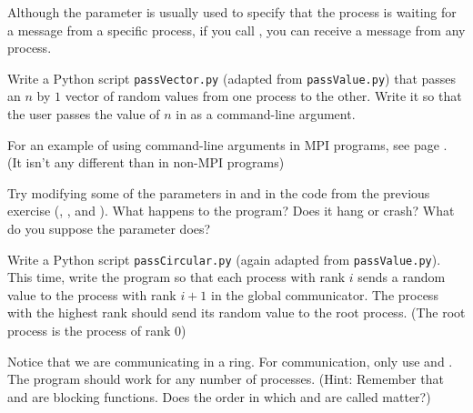 \begin{info}
Although the  parameter  is usually used to specify
that the process is waiting for a message from a specific process, if you call
, you can receive a message from
any process.
\end{info}


\begin{problem}
Write a Python script \texttt{passVector.py} (adapted from
\texttt{passValue.py}) that passes an $n$ by $1$ vector of random values from
one process to the other. Write it so that the user passes the value of $n$ in
as a command-line argument.

For an example of using command-line arguments in MPI programs, see page
\pageref{lst:MPI_Intro:trapParallel.py}. (It isn't any different than in non-MPI
programs)
\label{prob:MPI_Intro:passVector.py}
\end{problem}

\begin{problem}
Try modifying some of the parameters in  and  in the code from
the previous exercise (, , and ).  What happens to
the program? Does it hang or crash? What do you suppose the  parameter
does?
\label{prob:MPI_Intro:Send_parameters}
\end{problem}


\begin{problem}
Write a Python script \texttt{passCircular.py} (again adapted from
\texttt{passValue.py}). This time, write the program so that each process with
rank $i$ sends a random value to the process with rank $i+1$ in the global
communicator. The process with the highest rank should send its random value to
the root process. (The root process is the process of rank 0)

Notice that we are communicating in a ring. For communication, only use
 and . The program should work for any number of processes.
(Hint: Remember that  and  are blocking functions. Does the
order in which  and  are called matter?)
\label{prob:MPI_Intro:passCircular.py}
\end{problem}

